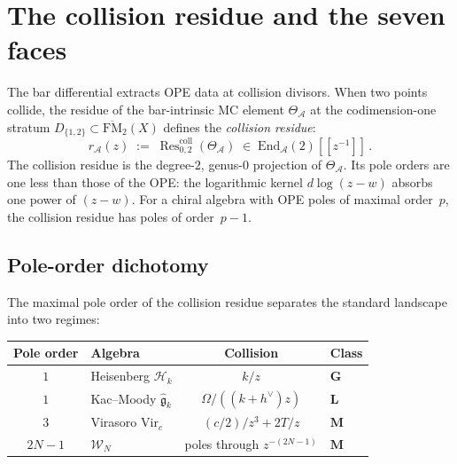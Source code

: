 \documentclass[11pt,reqno]{amsart}
\theoremstyle{definition}
\theoremstyle{remark}
\newcommand{\cA}{\mathcal{A}}
\newcommand{\cH}{\mathcal{H}}
\newcommand{\FM}{\overline{\mathrm{FM}}}
\newcommand{\fg}{\mathfrak{g}}
\newcommand{\Res}{\operatorname{Res}}
\newcommand{\Vir}{\mathrm{Vir}}
\numberwithin{equation}{section}
\newcommand{\End}{\mathrm{End}}
\begin{document}

\section{The collision residue and the seven faces}
\label{sec:seven-faces}

The bar differential extracts OPE data at collision divisors.
When two points collide, the residue of the bar-intrinsic MC
element $\Theta_\cA$ at the codimension-one stratum
$D_{\{1,2\}} \subset \FM_2(X)$ defines the \emph{collision
residue}:
\begin{equation}\label{eq:collision-residue}
r_\cA(z)
\;:=\;
\Res^{\mathrm{coll}}_{0,2}(\Theta_\cA)
\;\in\;
\End_\cA(2)[\![z^{-1}]\!]\,.
\end{equation}
The collision residue is the degree-$2$, genus-$0$ projection
of $\Theta_\cA$. Its pole orders are one less than those of
the OPE: the logarithmic kernel $d\log(z-w)$ absorbs one
power of $(z - w)$. For a chiral algebra with OPE poles of
maximal order~$p$, the collision residue has poles of
order~$p - 1$.

\subsection{Pole-order dichotomy}
\label{ssec:pole-dichotomy}

The maximal pole order of the collision residue separates the
standard landscape into two regimes:

\begin{center}
\renewcommand{\arraystretch}{1.3}
\begin{tabular}{clcl}
\toprule
\textbf{Pole order} & \textbf{Algebra}
 & \textbf{Collision} & \textbf{Class} \\
\midrule
$1$ & Heisenberg $\cH_k$ & $k/z$ & $\mathbf{G}$ \\
$1$ & Kac--Moody $\widehat{\fg}_k$ & $\Omega/((k{+}h^\vee)z)$ & $\mathbf{L}$ \\
$3$ & Virasoro $\Vir_c$ & $(c/2)/z^3 + 2T/z$ & $\mathbf{M}$ \\
$2N{-}1$ & $\mathcal{W}_N$ & poles through $z^{-(2N-1)}$
 & $\mathbf{M}$ \\
\bottomrule
\end{tabular}
\end{center}
\end{document}
